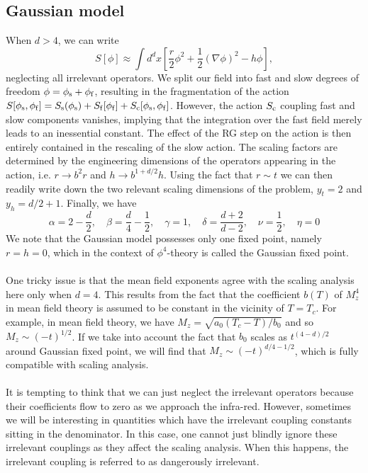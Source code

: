 \subsection{Gaussian model}
When $d > 4$, we can write
\[S[\phi] \approx \int d^dx \left[ \frac{r}{2}\phi^2 + \frac{1}{2}(\nabla\phi)^2- h\phi \right],\]
neglecting all irrelevant operators.
We split our field into fast and slow degrees of freedom $\phi = \phi_{\rm s} + \phi_{\rm f}$, 
resulting in the fragmentation of the action $S[\phi_{\rm s},\phi_{\rm f}] = S_{\rm s}(\phi_{\rm s}) + S_{\rm f}[\phi_{\rm f}] + S_{\rm c}[\phi_{\rm s},\phi_{\rm f}]$. 
However, the action $S_{\rm c}$ coupling fast and slow components vanishes, implying that the integration over the fast field merely leads to an inessential constant. 
The effect of the RG step on the action is then entirely contained in the rescaling of the slow action. 
The scaling factors are determined by the engineering dimensions of the operators appearing in the action, i.e. $r \to b^2r$ and $h \to b^{1+d/2}h$.
Using the fact that $r \sim t$ we can then readily write down the two relevant scaling dimensions of the problem, $y_t = 2$ and $y_h = d/2 + 1$. 
Finally, we have
\[\alpha = 2 - \frac{d}{2} , \quad \beta = \frac{d}{4} - \frac{1}{2} , \quad \gamma = 1 , \quad \delta = \frac{d+2}{d-2} , \quad \nu = \frac{1}{2} , \quad \eta = 0\]
We note that the Gaussian model possesses only one fixed point, namely $r = h = 0$, which in the context of $\phi^4$-theory is called the Gaussian fixed point.
\\ \\
One tricky issue is that the mean field exponents agree with the scaling analysis here only when $d = 4$.
This results from the fact that the coefficient $b(T)$ of $M_z^4$ in mean field theory is assumed to be constant in the vicinity of $T=T_c$.
For example, in mean field theory, we have $M_z = \sqrt{a_0(T_c-T)/b_0}$ and so $M_z \sim (-t)^{1/2}$.
If we take into account the fact that $b_0$ scales as $t^{(4-d)/2}$ around Gaussian fixed point, we will find that $M_z \sim (-t)^{d/4-1/2}$, which is fully compatible with scaling analysis.
\\ \\
It is tempting to think that we can just neglect the irrelevant operators because their coefficients flow to zero as we approach the infra-red. 
However, sometimes we will be interesting in quantities which have the irrelevant coupling constants sitting in the denominator.
In this case, one cannot just blindly ignore these irrelevant couplings as they affect the scaling analysis. 
When this happens, the irrelevant coupling is referred to as dangerously irrelevant.

